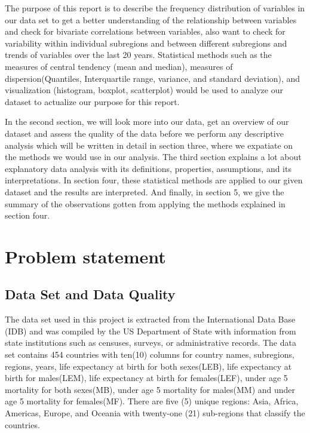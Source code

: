 \documentclass[12 pt]{scrartcl}
\begin{document}
The purpose of this report is to describe the frequency distribution of variables in our data set to get a better understanding of the relationship between variables and check for bivariate correlations between variables, also want to check for variability within individual subregions and between different subregions and trends of variables over the last 20 years. Statistical methods such as the measures of central tendency (mean and median), measures of dispersion(Quantiles, Interquartile range, variance, and standard deviation), and visualization (histogram, boxplot, scatterplot) would be used to analyze our dataset to actualize our purpose for this report.

In the second section, we will look more into our data, get an overview of our dataset and assess the quality of the data before we perform any descriptive analysis which will be written in detail in section three, where we expatiate on the methods we would use in our analysis. The third section explains a lot about explanatory data analysis with its definitions, properties, assumptions, and its interpretations. In section four, these statistical methods are applied to our given dataset and the results are interpreted. And finally, in section 5, we give the summary of the observations gotten from applying the methods explained in section four.



\section{Problem statement}


\subsection{Data Set and Data Quality}

The data set used in this project is extracted from the International Data Base (IDB) and was compiled by the US Department of State with information from state institutions such as censuses, surveys, or administrative records. The data set contains 454 countries with ten(10) columns for country names, subregions, regions, years, life expectancy at birth for both sexes(LEB), life expectancy at birth for males(LEM), life expectancy at birth for females(LEF), under age 5 mortality for both sexes(MB), under age 5 mortality for males(MM) and under age 5 mortality for females(MF). There are five (5) unique regions: Asia, Africa, Americas, Europe, and Oceania with twenty-one (21) sub-regions that classify the countries.
\end{document}
